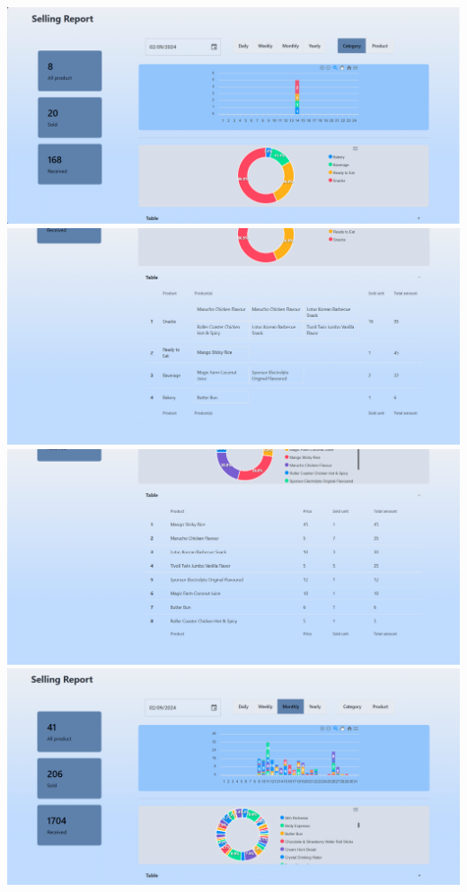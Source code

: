 {
\includegraphics[scale=0.35]{pic/ui/w18.png}
}\\
{
\includegraphics[scale=0.35]{pic/ui/w19.png}
}\\
{
\includegraphics[scale=0.35]{pic/ui/w20.png}
}\\
{
\includegraphics[scale=0.35]{pic/ui/w21.png}
}\\
